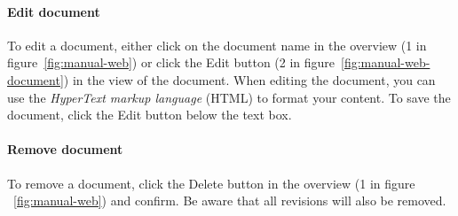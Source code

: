 	\paragraph{Edit document}
	To edit a document, either click on the document name in the overview (1 in figure~\ref{fig:manual-web}) or click the Edit button (2 in figure~\ref{fig:manual-web-document}) in the view of the document. When editing the document, you can use the \emph{HyperText markup language}\cite{w3cHTML} (HTML) to format your content. To save the document, click the Edit button below the text box.
	
	\paragraph{Remove document}
	To remove a document, click the Delete button in the overview (1 in figure ~\ref{fig:manual-web}) and confirm. Be aware that all revisions will also be removed.
